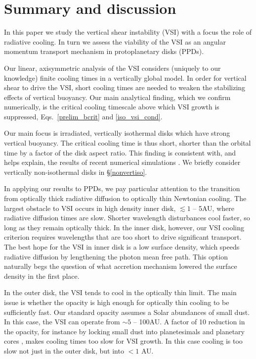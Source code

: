 \section{Summary and discussion}\label{summary}
In this paper we study the vertical shear instability (VSI) with a focus the 
role of radiative cooling.  In turn we assess the viability of the VSI 
as an angular momentum transport mechanism in protoplanetary disks (PPDs).

Our linear, axisymmetric analysis of the VSI 
considers (uniquely to our knowledge) finite cooling times in a vertically global model.  
In order for vertical shear to drive the VSI, short cooling times are needed to weaken 
the stabilizing effects of vertical buoyancy. Our main analytical finding, which we confirm numerically, 
is the critical cooling  timescale above which VSI growth is suppressed, Eqs.\ \ref{prelim_bcrit} and \ref{iso_vsi_cond}.


Our main focus is irradiated, vertically isothermal disks which have strong vertical buoyancy.
The critical cooling time is thus short, shorter than the orbital time by a factor of the disk
aspect ratio.  This finding is consistent with, and helps explain, the results of recent numerical simulations .
We briefly consider  vertically non-isothermal disks in \S\ref{nonvertiso}.

In applying our results to PPDs, we pay particular attention to the transition from 
optically thick radiative diffusion to optically thin Newtonian cooling.  The largest obstacle to VSI occurs in 
high density inner disk, $\lesssim 1$ -- 5AU, where radiative diffusion times are slow.  Shorter wavelength disturbances
 cool faster, so long as they remain optically thick.  In the inner disk, however, our VSI cooling criterion requires 
 wavelengths that are too short to drive significant transport.  The best hope for the VSI in inner disk is a low surface density, which speeds radiative diffusion by lengthening the photon mean free path.  This option naturally begs 
 the question of what accretion mechanism lowered the surface density in the first place. 
 
 In the outer disk, the VSI tends to cool in the optically thin limit.  The main issue is whether the opacity 
 is high enough for optically thin cooling to be sufficiently fast.  Our standard opacity assumes a Solar abundances of small dust.
 In this case, the VSI can operate from $\sim 5$ -- 100AU.  
A factor of 10 reduction in the opacity, for instance by locking
 small dust into planetesimals and planetary cores \citep{youdin13}, makes cooling times too slow for VSI growth.  
 In this case cooling is too slow not just in the outer disk, but into  $< 1$ AU.
 
